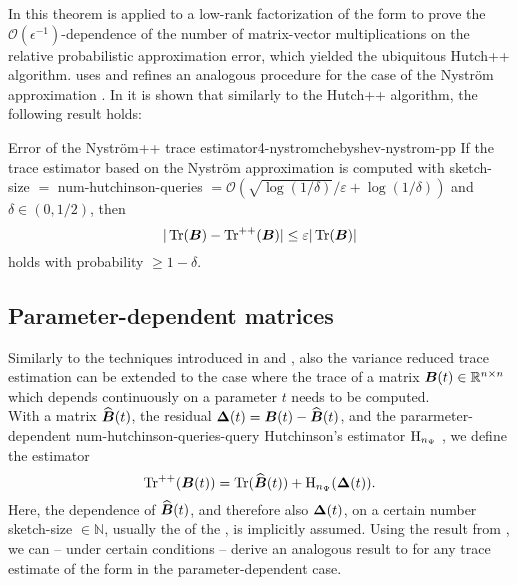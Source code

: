 In \cite{meyer2021hutch} this theorem is applied to a low-rank factorization of
the form  to prove the $\mathcal{O}(\epsilon^{-1})$-dependence
of the number of matrix-vector multiplications on the relative probabilistic
approximation error, which yielded the ubiquitous Hutch++ algorithm.
\cite{lin2017randomized} uses and \cite{persson2022hutch} refines an analogous procedure for the
case of the Nystr\"om approximation . In \cite[theorem~3.4]{persson2022hutch}
it is shown that similarly to the Hutch++ algorithm, the following result holds:
\begin{theorem}{Error of the Nystr\"om++ trace estimator}{4-nystromchebyshev-nystrom-pp}
    If the trace estimator  based
    on the Nystr\"om approximation  is computed
    with \gls{sketch-size} $=$ \gls{num-hutchinson-queries} $= \mathcal{O}(\sqrt{\log(1/\delta)}/\varepsilon + \log(1/\delta))$
    and $\delta \in (0, 1/2)$, then
    \begin{equation}
        |\operatorname{Tr}(\boldsymbol{B}) - \operatorname{Tr}^{++}(\boldsymbol{B})| \leq \varepsilon |\operatorname{Tr}(\boldsymbol{B})|
    \end{equation}
    holds with probability $\geq 1-\delta$.
\end{theorem}

\subsection{Parameter-dependent matrices}
\label{subsec:4-nystromchebyshev-reduction-parametrized-matrices}

Similarly to the techniques introduced in  and ,
also the variance reduced trace estimation can be extended to the case where
the trace of a matrix $\boldsymbol{B}(t) \in \mathbb{R}^{n \times n}$ which depends continuously on a parameter $t$
needs to be computed.\\

With a matrix $\widehat{\boldsymbol{B}}(t)$, the residual $\boldsymbol{\Delta}(t) = \boldsymbol{B}(t) - \widehat{\boldsymbol{B}}(t)$,
and the pararmeter-dependent \gls{num-hutchinson-queries}-query Hutchinson's estimator $\operatorname{H}_{n_{\Psi}}$
, we define the estimator 
\begin{equation}
    \operatorname{Tr}^{++}(\boldsymbol{B}(t)) = \operatorname{Tr}(\widehat{\boldsymbol{B}}(t)) + \operatorname{H}_{n_{\Psi}}(\boldsymbol{\Delta}(t)).
    \label{equ:4-nystromchebyshev-parameter-hutch-pp}
\end{equation}
Here, the dependence of $\widehat{\boldsymbol{B}}(t)$, and therefore also $\boldsymbol{\Delta}(t)$,
on a certain number \gls{sketch-size} $\in \mathbb{N}$, usually the 
of the , is implicitly assumed.
Using the result from ,
we can -- under certain conditions -- derive an analogous result
to  for any trace estimate of the form
 in the parameter-dependent case.

